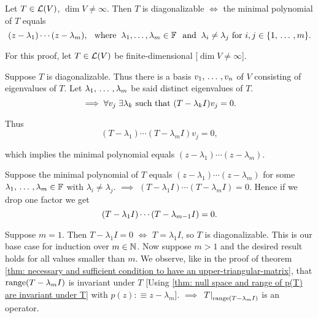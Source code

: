 \setcounter{thm}{61}
\begin{thm}
  \label{thm: necessary and sufficient condition for diagonalizability}
  Let $T\in \mathcal{L} (V)$, $\dim V \neq \infty$. Then $T$ is diagonalizable $\iff$ the minimal polynomial of $T$ equals
  \begin{equation}
    (z-\lambda_1) \cdots (z-\lambda_m), \where \lambda_1, \dots, \lambda_m \in \myF \myand \lambda_i \neq  \lambda_j $ for $ i,j \in \{1, \ddd, m \}.
  \end{equation}
\end{thm}
\begin{prf} For this proof, let $T\in \mathcal{L} (V)$ be finite-dimensional [$\dim V \neq \infty$].

   Suppose $T$ is diagonalizable. Thus there is a basis $v_1, {\, \ldots \,\,}, v_n$ of $V$ consisting of eigenvalues of $T$.  Let $\lambda_1, {\, \ldots \,\,}, \lambda_m$ be said distinct eigenvalues of $T$. %
  \begin{equation}
    \implies \forall v_j \; \exists \lambda_k $ \st $ (T-\lambda_k I)v_j = 0.
  \end{equation}

  Thus
  \begin{equation}
    (T-\lambda_1) \cdots (T-\lambda_m I)v_j =0,
  \end{equation}

  which implies the minimal polynomial equals $(z-\lambda_1)\cdots(z-\lambda_m).$

   Suppose the minimal polynomial of $T$ equals $(z-\lambda_1) \cdots (z-\lambda_m)$ for some $\lambda_1, {\, \ldots \,\,}, \lambda_m \in  \mathbb{F}$ with $\lambda_i \neq \lambda_j$.
  $\implies$ $(T-\lambda_1 I) \cdots (T-\lambda_m I)=0.$ Hence if we drop one factor we get
  \begin{equation}
    \label{eq: (t-l1 I)***(t-l_{m-1}I)=0}
    (T-\lambda_1 I) \cdots (T-\lambda_{m-1} I)=0.
  \end{equation}

  Suppose $m=1$. Then $T-\lambda_1 I = 0$ $\iff$ $T=\lambda_1 I$, so $T$ is diagonalizable. This is our base case for induction over $m \in \mathbb{N}$.
  Now suppose $m>1$ and the desired result holds for all values smaller than $m$. We observe, like in the proof of theorem \ref{thm: necessary and sufficient condition to have an upper-triangular-matrix}, that $\operatorname{range} (T-\lambda_m I)$ is invariant under $T$ [Using \ref{thm: null space and range of p(T) are invariant under T} with $p(z) :\equiv z-\lambda_m$]. $\implies$ $\left . T \right |_{\operatorname{range}(T-\lambda_m I)}$ is an operator.


\end{prf}
